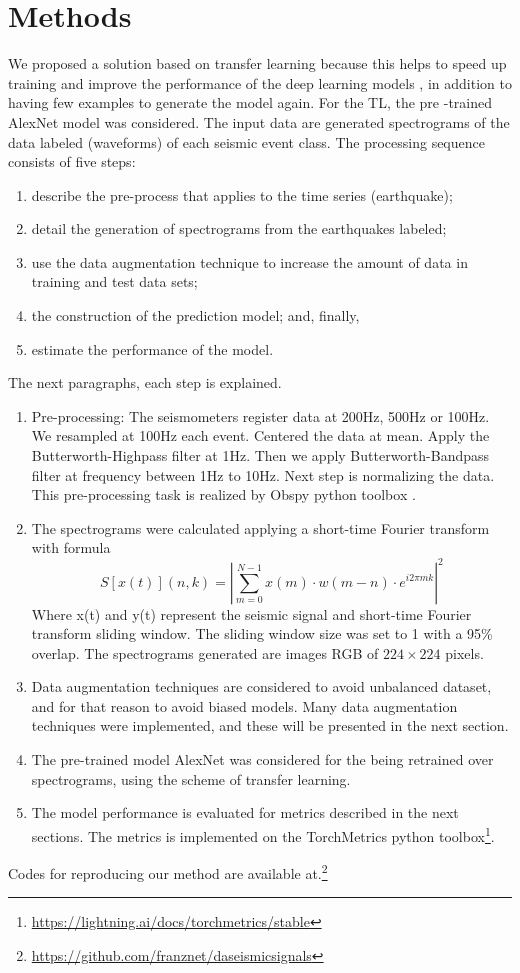 \documentclass[journal]{IEEEtran}
\begin{document}
\section{Methods} \label{methods}
We proposed a solution based on transfer learning because this helps to speed up training and improve the performance of the deep learning models \cite{titos2019classification,bueno2019volcano}, in addition to having few examples to generate the model again. For the TL, the pre -trained AlexNet\cite{krizhevsky2012imagenet} model was considered.
The input data are generated spectrograms of the data labeled (waveforms) of each seismic event class. The processing sequence consists of five steps:
\begin{enumerate}
 \item describe the pre-process that applies to the time series (earthquake);
 \item detail the generation of spectrograms from the earthquakes labeled;
 \item use the data augmentation technique to increase the amount of data in training and test data sets;
 \item the construction of the prediction model; and, finally,
 \item estimate the performance of the model.
\end{enumerate}
The next paragraphs, each step is explained.
\begin{enumerate}
	\item Pre-processing: The seismometers register data at 200Hz, 500Hz or 100Hz. We resampled at 100Hz each event. Centered the data at mean. Apply the Butterworth-Highpass filter at 1Hz. Then we apply Butterworth-Bandpass filter at frequency between 1Hz to 10Hz. Next step is normalizing the data. This pre-processing task is realized by Obspy python toolbox \cite{beyreuther2010obspy}.
	\item The spectrograms were calculated applying a short-time Fourier transform with formula
$$
S[x(t)](n,k)=\left|\sum_{m=0}^{N-1}x(m)\cdot w(m-n)\cdot e^{i2\pi mk}\right|^2$$
Where x(t) and y(t) represent the seismic signal and short-time Fourier transform sliding window. The sliding window size was set to 1 with a 95\% overlap. The spectrograms generated are images RGB of $224\times224$ pixels.
	\item Data augmentation techniques are considered to avoid unbalanced dataset, and for that reason to avoid biased models. Many data augmentation techniques were implemented, and these will be presented in the next section.
	\item The pre-trained model AlexNet\cite{krizhevsky2012imagenet} was considered for the being retrained over spectrograms, using the scheme of transfer learning.
	\item The model performance is evaluated for metrics described in the next sections. The metrics is implemented on the TorchMetrics python toolbox\footnote{\href{https://lightning.ai/docs/torchmetrics/stable}{\color{blue}https://lightning.ai/docs/torchmetrics/stable}}.
\end{enumerate}
Codes for reproducing our method are available at.\footnote{\href{https://github.com/franznet/daseismicsignals}{\color{blue}https://github.com/franznet/daseismicsignals}}
\end{document}
